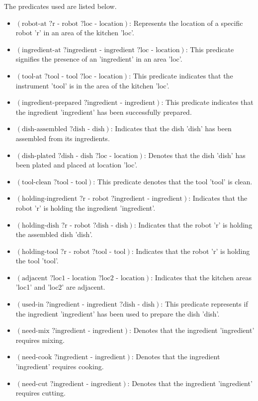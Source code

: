  The predicates used are listed below.
\begin{itemize}
  \item $ (\text{robot-at } ? \text{r - robot } ? \text{loc - location}) $: Represents the location of a specific robot 'r' in an area of the kitchen 'loc'.
  \item $ (\text{ingredient-at } ?\text{ingredient - ingredient } ?\text{loc - location}) $: This predicate signifies the presence of an 'ingredient' in an area 'loc'.
  \item $ (\text{tool-at } ?\text{tool - tool } ?\text{loc - location}) $: This predicate indicates that the instrument 'tool' is in the area of the kitchen 'loc'.
  \item $ (\text{ingredient-prepared } ?\text{ingredient - ingredient}) $: This predicate indicates that the ingredient 'ingredient' has been successfully prepared.
  \item $ (\text{dish-assembled } ?\text{dish - dish}) $: Indicates that the dish 'dish' has been assembled from its ingredients.
  \item $ (\text{dish-plated } ?\text{dish - dish } ?\text{loc - location}) $: Denotes that the dish 'dish' has been plated and placed at location 'loc'.
  \item $ (\text{tool-clean } ?\text{tool - tool}) $: This predicate denotes that the tool 'tool' is clean.
  \item $ (\text{holding-ingredient } ?\text{r - robot } ?\text{ingredient - ingredient}) $: Indicates that the robot 'r' is holding the ingredient 'ingredient'.
  \item $ (\text{holding-dish } ?\text{r - robot } ?\text{dish - dish}) $: Indicates that the robot 'r' is holding the assembled dish 'dish'.
  \item $ (\text{holding-tool } ?\text{r - robot } ?\text{tool - tool}) $: Indicates that the robot 'r' is holding the tool 'tool'.
  \item $ (\text{adjacent } ?\text{loc1 - location } ?\text{loc2 - location}) $: Indicates that the kitchen areas 'loc1' and 'loc2' are adjacent.
  \item $ (\text{used-in } ?\text{ingredient - ingredient } ?\text{dish - dish}) $: This predicate represents if the ingredient 'ingredient' has been used to prepare the dish 'dish'.
  \item $ (\text{need-mix } ?\text{ingredient - ingredient}) $: Denotes that the ingredient 'ingredient' requires mixing.
  \item $ (\text{need-cook } ?\text{ingredient - ingredient}) $: Denotes that the ingredient 'ingredient' requires cooking.
  \item $ (\text{need-cut } ?\text{ingredient - ingredient}) $: Denotes that the ingredient 'ingredient' requires cutting.
\end{itemize}
